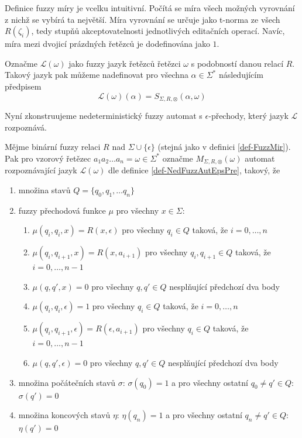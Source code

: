 \documentclass[a4paper,10pt]{article}
\begin{document}
Definice fuzzy míry je vcelku intuitivní. Počítá se míra všech možných vyrovnání z nichž se vybírá ta největší. Míra vyrovnání se určuje jako t-norma ze všech $R(\zeta_i)$, tedy stupňů akceptovatelnosti jednotlivých editačních operací. Navíc, míra mezi dvojicí prázdných řetězců je dodefinována jako $1$.

Označme $\mathcal{L}(\omega)$ jako fuzzy jazyk řetězců  řetězci $\omega$ s podobností danou relací $R$. Takový jazyk pak můžeme nadefinovat pro  všechna $\alpha \in \Sigma^*$ následujícím předpisem
$$
 \mathcal{L}(\omega)(\alpha) = S_{\Sigma, R, \otimes}(\alpha, \omega)
$$

Nyní zkonstruujeme nedeterministický fuzzy automat s $\epsilon$-přechody, který jazyk $\mathcal{L}$ rozpoznává. 

\begin{definition} \label{def-AutRozpCalL}
 Mějme binární fuzzy relaci $R$ nad $\Sigma \cup \{\epsilon\}$ (stejná jako v definici \ref{def-FuzzMir}). Pak pro vzorový řetězec $a_1 a_2 \dots a_n = \omega \in \Sigma^*$ označme $M_{\Sigma, R, \otimes}(\omega)$ automat rozpoznávající jazyk $\mathcal{L}(\omega)$ dle definice \ref{def-NedFuzzAutEpsPre}, takový, že
 \begin{enumerate}
  \item množina stavů $Q = \{ q_0, q_1, \dots q_n \}$
  \item fuzzy přechodová funkce $\mu$ pro všechny $x \in \Sigma$:
  \begin{enumerate}
   \item $\mu(q_i, q_i, x) = R(x, \epsilon)$ pro všechny $q_i \in Q$ taková, že $i = 0, \dots, n$
   \item $\mu(q_i, q_{i+1}, x) = R(x, a_{i+1})$ pro všechny $q_i, q_{i+1} \in Q$ taková, že $i = 0, \dots, n-1$
   \item $\mu(q, q', x) = 0$ pro všechny $q, q' \in Q$ nesplňující předchozí dva body

   \item $\mu(q_i, q_i, \epsilon) = 1$ pro všechny $q_i \in Q$ taková, že $i = 0, \dots, n$
   \item $\mu(q_i, q_{i+1}, \epsilon) = R(\epsilon, a_{i+1})$ pro všechny $q_i \in Q$ taková, že $i = 0, \dots, n-1$
   \item $\mu(q, q', \epsilon) = 0$ pro všechny $q, q' \in Q$ nesplňující předchozí dva body 
  \end{enumerate}
  \item množina počátečních stavů $\sigma$: $\sigma(q_0) = 1$ a pro všechny ostatní $q_0 \neq q' \in Q$: $\sigma(q') = 0$ 
  \item množina koncových stavů $\eta$: $\eta(q_n) = 1$ a pro všechny ostatní $q_n \neq q' \in Q$: $\eta(q') = 0$
 \end{enumerate}
\end{definition}
\end{document}

